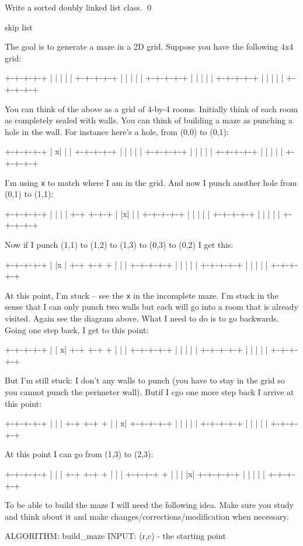 \begin{ex}
Write a sorted doubly linked list class.
\qed
\end{ex}


\begin{ex}
  skip list
\end{ex}

\begin{ex}
The goal is to generate a maze in a 2D grid.
Suppose you have the following 4x4 grid:
\begin{console}
+-+-+-+-+
| | | | |
+-+-+-+-+
| | | | |
+-+-+-+-+
| | | | |
+-+-+-+-+
| | | | |
+-+-+-+-+
\end{console}
You can think of the above as a grid of 4-by-4 rooms.
Initially think of each room as completely sealed with walls.
You can think of building a maze as punching a hole in the wall.
For instance here's a hole, from (0,0) to (0,1):
\begin{console}
+-+-+-+-+
|  x| | |
+-+-+-+-+
| | | | |
+-+-+-+-+
| | | | |
+-+-+-+-+
| | | | |
+-+-+-+-+
\end{console}
I'm using \texttt{x} to match where I am in the grid.
And now I punch another hole from (0,1) to (1,1):
\begin{console}
+-+-+-+-+
|   | | |
+-+ +-+-+
| |x| | |
+-+-+-+-+
| | | | |
+-+-+-+-+
| | | | |
+-+-+-+-+
\end{console}
Now if I punch (1,1) to (1,2) to (1,3) to (0,3) to (0,2) I get this:
\begin{console}
+-+-+-+-+
|   |x  |
+-+ +-+ +
| |     |
+-+-+-+-+
| | | | |
+-+-+-+-+
| | | | |
+-+-+-+-+
\end{console}
At this point, I'm stuck -- see the \texttt{x} in the incomplete maze.
I'm stuck in the sense that I can only punch two walls but each will
go into a room that is already visited. Again see the diagram above.
What I need to do is to go backwards.
Going one step back, I get to this point:
\begin{console}
+-+-+-+-+
|   |  x|
+-+ +-+ +
| |     |
+-+-+-+-+
| | | | |
+-+-+-+-+
| | | | |
+-+-+-+-+
\end{console}
But I'm still stuck: I don't any walls to punch (you have to stay in
the grid so you cannot punch the perimeter wall).
Butif I cgo one more step back I arrive at this point:
\begin{console}
+-+-+-+-+
|   |   |
+-+ +-+ +
| |    x|
+-+-+-+-+
| | | | |
+-+-+-+-+
| | | | |
+-+-+-+-+
\end{console}
At this point I can go from (1,3) to (2,3):
\begin{console}
+-+-+-+-+
|   |   |
+-+ +-+ +
| |     |
+-+-+-+ +
| | | |x|
+-+-+-+-+
| | | | |
+-+-+-+-+
\end{console}
To be able to build the maze I will need the following idea.
Make sure you study and think about it and make
changes/corrections/modification when necessary.
\begin{console}
ALGORITHM: build_maze
INPUT: (r,c) - the starting point


\end{console}
\end{ex}
